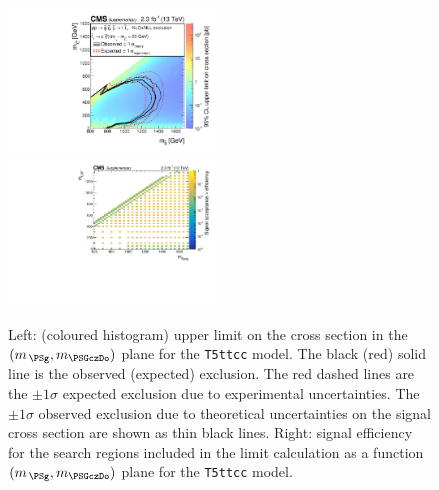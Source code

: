 \clearpage
\begin{figure}[t]
  \begin{center}
    \includegraphics[width=0.49\textwidth]{RA1T5ttccXSEC_aux} \, 
    \includegraphics[width=0.49\textwidth]{T5ttcc_merging_4_cats_aux} \,     
  \end{center}
  \caption{Left: (coloured histogram) upper limit on the cross section in the $(m_{\,\PSg}, m_{\PSGczDo})$ plane for the \texttt{T5ttcc} model. 
  The black (red) solid line is the observed (expected) exclusion. The red dashed lines are the $\pm1\sigma$ expected exclusion due to experimental uncertainties. 
  The $\pm1\sigma$ observed exclusion due to theoretical uncertainties on the signal cross section are shown as thin black lines. 
  Right: signal efficiency for the search regions included in the limit calculation as a function $(m_{\,\PSg}, m_{\PSGczDo})$ plane for the \texttt{T5ttcc} model. 
  \label{fig:T5ttcc_excl}}
\end{figure}

